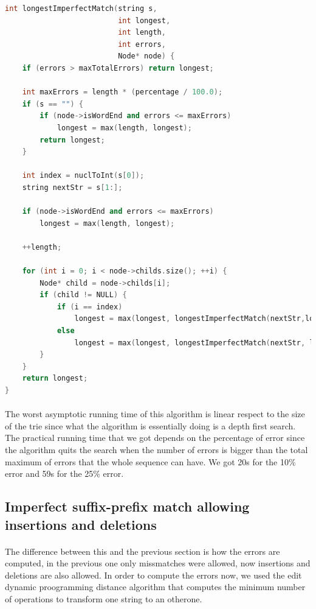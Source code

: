 \documentclass[a4paper,10pt]{article}
\begin{document}
\begin{lstlisting}[language=c++, caption=Recursive algorithm for imperfect suffix-prefix match]
int longestImperfectMatch(string s,
                          int longest,
                          int length,
                          int errors,
                          Node* node) {
    if (errors > maxTotalErrors) return longest;

    int maxErrors = length * (percentage / 100.0);
    if (s == "") {
        if (node->isWordEnd and errors <= maxErrors) 
            longest = max(length, longest);
        return longest;
    }

    int index = nuclToInt(s[0]);
    string nextStr = s[1:];

    if (node->isWordEnd and errors <= maxErrors) 
        longest = max(length, longest);

    ++length;

    for (int i = 0; i < node->childs.size(); ++i) {
        Node* child = node->childs[i];
        if (child != NULL) {
            if (i == index) 
                longest = max(longest, longestImperfectMatch(nextStr,longest, length, errors, child));
            else 
                longest = max(longest, longestImperfectMatch(nextStr, longest, length, errors+1, child));
        }
    }
    return longest;
}
\end{lstlisting}

\paragraph{} The worst asymptotic running time of this algorithm is linear respect to the size of the trie since what the algorithm is essentially doing is a depth first search.
The practical running time that we got depends on the percentage of error since the algorithm quits the search when the number of errors is bigger than the total maximum of errors that the whole sequence can have.
We got 20s for the 10\% error and 59s for the 25\% error.

\subsection{Imperfect suffix-prefix match allowing insertions and deletions}

\paragraph{} The difference between this and the previous section is how the errors are computed, in the previous one only missmatches were allowed, now insertions and deletions are also allowed.
In order to compute the errors now, we used the edit dynamic proogramming distance algorithm that computes the minimum number of operations to transform one string to an otherone.
\end{document}
